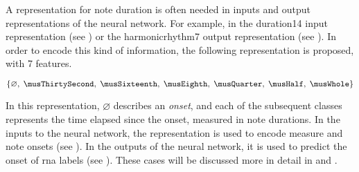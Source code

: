 
A representation for note duration is often needed in inputs
and output representations of the neural network. For
example, in the \gls{duration14} input representation (see
) or the \gls{harmonicrhythm7} output
representation (see ). In
order to encode this kind of information, the following
representation is proposed, with 7 features.

\begin{equation}
    \{\varnothing,\; \musThirtySecond,\; \musSixteenth,\; \musEighth,\; 
    \musQuarter,\; \musHalf,\; \musWhole \}
\end{equation}

In this representation, $\varnothing$ describes an
\emph{onset}, and each of the subsequent classes represents
the time elapsed since the onset, measured in note
durations. In the inputs to the neural network, the
representation is used to encode measure and note onsets
(see ). In the outputs of
the neural network, it is used to predict the onset of
\gls{rna} labels (see ). These
cases will be discussed more in detail in
 and .
